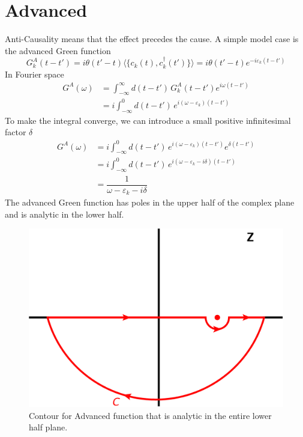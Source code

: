 \documentclass[aps,prb,onecolumn,notitlepage,showpacs,floatfix,superscriptaddress]{revtex4-1}
\begin{document}
\section{Advanced}
Anti-Causality means that the effect precedes the cause. A simple model case is the advanced Green function
\begin{equation}
G^A_k(t-t')=i\theta(t'-t) \langle \{ c_k(t),c_k^\dagger(t')\}\rangle = i\theta(t'-t) e^{-i\varepsilon_k (t-t')}
\end{equation}
In Fourier space
\begin{equation}
\begin{split}
G^A(\omega) &= \int_{-\infty}^\infty d(t-t') \, G^A_k(t-t') e^{i \omega (t-t')} \\
&= i\int_{-\infty}^0 d(t-t') \, e^{i (\omega-\varepsilon_k) (t-t')} 
\end{split}
\end{equation}
To make the integral converge, we can introduce a small positive infinitesimal factor $\delta$
\begin{equation}
\begin{split}
G^A(\omega) &= i\int_{-\infty}^0 d(t-t') \, e^{i (\omega-\varepsilon_k) (t-t')} e^{\delta(t-t')} \\
 &= i\int_{-\infty}^0 d(t-t') \, e^{i (\omega-\varepsilon_k-i\delta) (t-t')} \\
 &= \dfrac{1}{\omega-\varepsilon_k-i\delta}
\end{split}
\end{equation}
The advanced Green function has poles in the upper half of the complex plane and is analytic in the lower half. \\
\begin{figure}[hbtp]
\centering
\includegraphics[scale=0.07]{advanced.png}
\caption{Contour for Advanced function that is analytic in the entire lower half plane.}
\end{figure}
\end{document}
